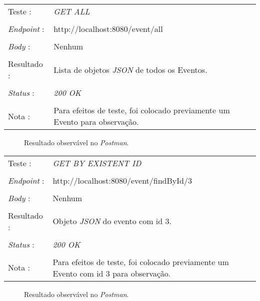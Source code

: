 \begin{tabular}{ll}
	Teste : & \emph{GET ALL}\\
	\\
	\emph{Endpoint} : & http://localhost:8080/event/all\\
	\\
	\emph{Body} : & Nenhum\\
	\\
	Resultado : & Lista de objetos \emph{JSON} de todos os Eventos.\\
	\\
	\emph{Status} : & \emph{200 OK}\\
	\\
	Nota : & Para efeitos de teste, foi colocado previamente um Evento para observação.\\
\end{tabular}

\begin{figure}[h]
	\begin{center}
	\end{center}
	\caption{Resultado observável no \emph{Postman}.}\label{fig:eventall}
\end{figure}
\newpage
\begin{tabular}{ll}
	Teste : & \emph{GET BY EXISTENT ID }\\
	\\
	\emph{Endpoint} : & http://localhost:8080/event/findById/3\\
	\\
	\emph{Body} : & Nenhum\\
	\\
	Resultado : & Objeto \emph{JSON} do evento com id 3.\\
	\\
	\emph{Status} : & \emph{200 OK}\\
	\\
	Nota : & Para efeitos de teste, foi colocado previamente um Evento com id 3 para observação. \\
\end{tabular}

\begin{figure}[h]
	\begin{center}
	\end{center}
	\caption{Resultado observável no \emph{Postman}.}\label{fig:eventfindbyid200}
\end{figure}
\newpage


